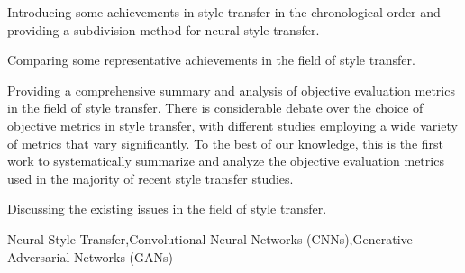 \documentclass[preprint,12pt]{elsarticle}
\begin{document}
\begin{frontmatter}
\begin{highlights}
\item  Introducing some achievements in style transfer in the chronological order and providing a subdivision method for neural style transfer.
\item Comparing some representative achievements in the field of style transfer.
\item Providing a comprehensive summary and analysis of objective evaluation metrics in the field of style transfer. There is considerable debate over the choice of objective metrics in style transfer, with different studies employing a wide variety of metrics that vary significantly. To the best of our knowledge, this is the first work to systematically summarize and analyze the objective evaluation metrics used in the majority of recent style transfer studies. 
\item Discussing the existing issues in the field of style transfer.
\end{highlights}
\begin{keyword}
Neural Style Transfer\sep Convolutional Neural Networks (CNNs)\sep Generative Adversarial Networks (GANs)


\end{keyword}

\end{frontmatter}












\end{document}
